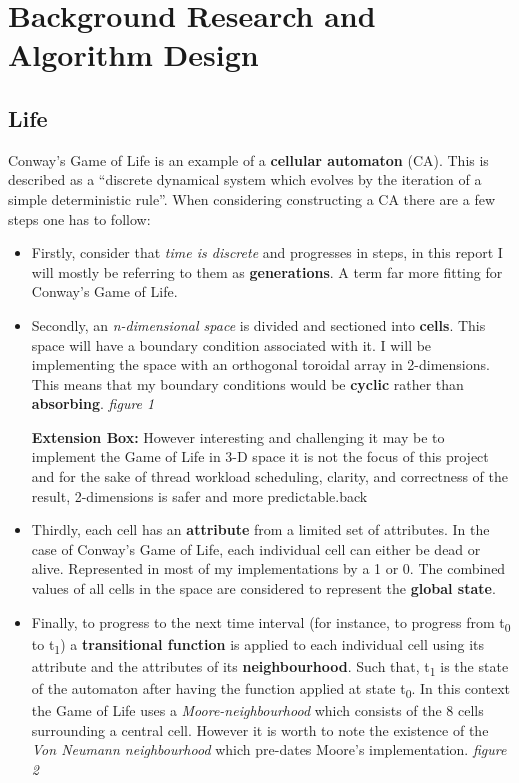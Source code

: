 \documentclass[11pt]{article} %
\begin{document}
\section{Background Research and Algorithm Design}
\subsection{Life}
Conway's Game of Life is an example of a {\bf cellular automaton} (CA). This is described \cite[Lesser, Wuensche, 1992 p6]{ref6} as a ``discrete dynamical system which evolves by the iteration of a simple deterministic rule''. When considering constructing a CA there are a few steps one has to follow:
\begin{itemize}
\item Firstly, consider that \emph{time is discrete} and progresses in steps, in this report I will mostly be referring to them as {\bf generations}. A term far more fitting for Conway's Game of Life. 
\item Secondly, an \emph{n-dimensional space} is divided and sectioned into {\bf cells}. This space will have a boundary condition associated with it. I will be implementing the space with an orthogonal toroidal array in 2-dimensions. This means that my boundary conditions would be {\bf cyclic} rather than {\bf absorbing}. {\it figure 1}
\begin{mdframed}
{\bf Extension Box:} However interesting and challenging it may be to implement the Game of Life in 3-D space it is not the focus of this project and for the sake of thread workload scheduling, clarity, and correctness of the result, 2-dimensions is safer and more predictable.back
\end{mdframed}
\item Thirdly, each cell has an {\bf attribute} from a limited set of attributes. In the case of Conway's Game of Life, each individual cell can either be dead or alive. Represented in most of my implementations by a 1 or 0. The combined values of all cells in the space are considered to represent the {\bf global state}.
\item Finally, to progress to the next time interval (for instance, to progress from t\textsubscript{0} to t\textsubscript{1}) a {\bf transitional function} is applied to each individual cell using its attribute and the attributes of its {\bf neighbourhood}. Such that, t\textsubscript{1} is the state of the automaton after having the function applied at state t\textsubscript{0}. In this context the Game of Life uses a \emph{Moore-neighbourhood} which consists of the 8 cells surrounding a central cell. However it is worth to note the existence of the \emph{Von Neumann neighbourhood} which pre-dates Moore's implementation. {\it figure 2}
\end{itemize}
\end{document}
